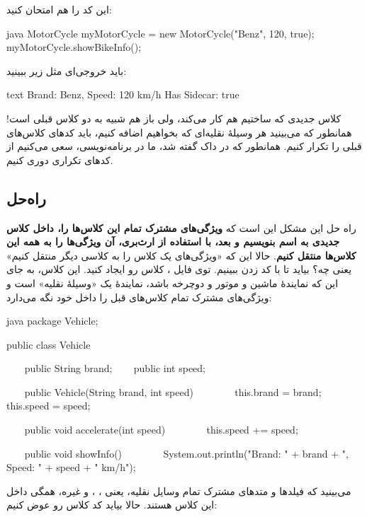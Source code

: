 این کد را هم امتحان کنید:

\begin{codebox}{java}
MotorCycle myMotorCycle = new MotorCycle("Benz", 120, true);  
myMotorCycle.showBikeInfo();
\end{codebox}

باید خروجی‌ای مثل زیر ببینید:

\begin{codebox}{text}
Brand: Benz, Speed: 120 km/h  
Has Sidecar: true
\end{codebox}

کلاس جدیدی که ساختیم هم کار می‌کند، ولی باز هم شبیه‌ به دو کلاس قبلی است!
همانطور که می‌بینید هر وسیلهٔ نقلیه‌ای که بخواهیم اضافه کنیم، باید کدهای
کلاس‌های قبلی را تکرار کنیم. همانطور که در داک  گفته شد،
ما در برنامه‌نویسی، سعی می‌کنیم از کدهای تکراری دوری کنیم.

\subsection{راه‌حل}

راه حل این مشکل این است که \textbf{ویژگی‌های مشترک تمام این کلاس‌ها را،
داخل کلاس جدیدی به اسم  بنویسیم و بعد، با استفاده
از ارث‌بری، آن ویژگی‌ها را به همه این کلاس‌ها منتقل کنیم}. حالا این‌ که
«ویژگی‌های یک کلاس‌ را به کلاسی دیگر منتقل کنیم» یعنی چه؟ بیاید تا با کد
زدن ببینیم. توی فایل  ، کلاس
 رو ایجاد کنید. این کلاس، به جای این که نمایندهٔ
ماشین و موتور و دوچرخه باشد، نمایندهٔ یک «وسیلهٔ نقلیه‌» است و ویژگی‌های
مشترک تمام کلاس‌های قبل را داخل خود نگه می‌دارد:

\begin{codebox}{java}
package Vehicle;

public class Vehicle {
    public String brand;
    public int speed;

    public Vehicle(String brand, int speed) {
        this.brand = brand;
        this.speed = speed;  
    }

    public void accelerate(int speed) {
        this.speed += speed;  
    }

    public void showInfo() {  
        System.out.println("Brand: " + brand + ", Speed: " + speed + " km/h");  
    }  
}
\end{codebox}

می‌بینید که فیلدها و متدهای مشترک تمام وسایل نقلیه، یعنی
 ،  ،  و
غیره، همگی داخل این کلاس هستند. حالا بیاید کد کلاس  رو
عوض کنیم:

